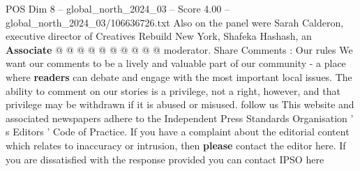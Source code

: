 \begin{textsample}{POS Dim 8 – global\_north\_2024\_03 – Score 4.00 – global\_north\_2024\_03/106636726.txt}
Also on the panel were Sarah Calderon, executive director of Creatives Rebuild New York, Shafeka Hashash, an \textbf{Associate} @ @ @ @ @ @ @ @ @ @ moderator.
Share Comments : Our rules We want our comments to be a lively and valuable part of our community - a place where \textbf{readers} can debate and engage with the most important local issues.
The ability to comment on our stories is a privilege, not a right, however, and that privilege may be withdrawn if it is abused or misused. follow us This website and associated newspapers adhere to the Independent Press Standards Organisation ' s Editors ' Code of Practice.
If you have a complaint about the editorial content which relates to inaccuracy or intrusion, then \textbf{please} contact the editor here.
If you are dissatisfied with the response provided you can contact IPSO here

\end{textsample}
